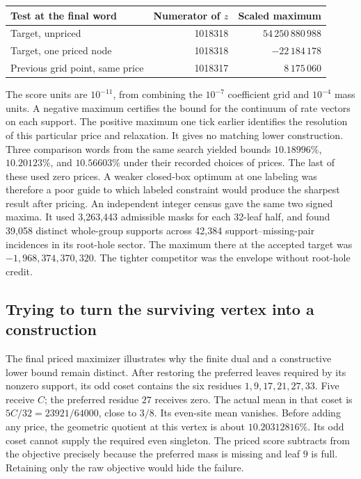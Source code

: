 \documentclass[12pt,letterpaper]{article}
\begin{document}
\begin{center}
\begin{tabular}{@{}lrr@{}}
\toprule
Test at the final word & Numerator of \(z\) & Scaled maximum\\
\midrule
Target, unpriced  & 1018318 & \(54\,250\,880\,988\)\\
Target, one priced node & 1018318 & \(-22\,184\,178\)\\
Previous grid point, same price & 1018317 & \(8\,175\,060\)\\
\bottomrule
\end{tabular}
\end{center}
The score units are \(10^{-11}\), from combining the \(10^{-7}\) coefficient grid and \(10^{-4}\) mass units. A negative maximum certifies the bound for the continuum of rate vectors on each support. The positive maximum one tick earlier identifies the resolution of this particular price and relaxation. It gives no matching lower construction. Three comparison words from the same search yielded bounds \(10.18996\%\), \(10.20123\%\), and \(10.56603\%\) under their recorded choices of prices. The last of these used zero prices. A weaker closed-box optimum at one labeling was therefore a poor guide to which labeled constraint would produce the sharpest result after pricing. An independent integer census gave the same two signed maxima. It used 3,263,443 admissible masks for each 32-leaf half, and found 39,058 distinct whole-group supports across 42,384 support--missing-pair incidences in its root-hole sector. The maximum there at the accepted target was \(-1{,}968{,}374{,}370{,}320\). The tighter competitor was the envelope without root-hole credit.

\subsection{Trying to turn the surviving vertex into a construction}

The final priced maximizer illustrates why the finite dual and a constructive lower bound remain distinct. After restoring the preferred leaves required by its nonzero support, its odd coset contains the six residues \(1,9,17,21,27,33\). Five receive \(C\); the preferred residue \(27\) receives zero. The actual mean in that coset is \(5C/32=23921/64000\), close to \(3/8\). Its even-site mean vanishes. Before adding any price, the geometric quotient at this vertex is about \(10.20312816\%\). Its odd coset cannot supply the required even singleton. The priced score subtracts from the objective precisely because the preferred mass is missing and leaf \(9\) is full. Retaining only the raw objective would hide the failure.
\end{document}
